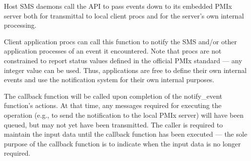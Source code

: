 Host \ac{SMS} daemons call the API to pass events down to its embedded \ac{PMIx} server both for transmittal to local client procs and for the server's own internal processing.

Client application procs can call this function to notify the \ac{SMS} and/or other application processes of an event it encountered. Note that procs are not constrained to report status values defined in the official \ac{PMIx} standard --- any integer value can be used. Thus, applications are free to define their own internal events and use the notification system for their own internal purposes.

\adviceuserstart
The callback function will be called upon completion of the
notify_event function's actions. At that time, any messages required for executing the operation (e.g., to send the notification to the local \ac{PMIx} server) will
have been queued, but may not yet have been transmitted. The caller is required to maintain the input
data until the callback function has been executed --- the sole purpose of the callback function is to indicate when the input data is no longer required.
\adviceuserend


